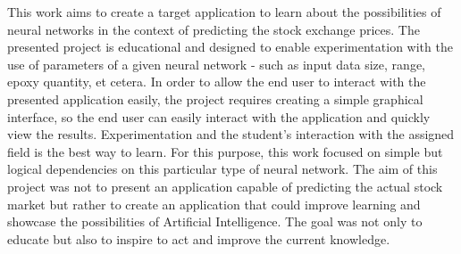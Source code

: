     \par
    \bigskip
    This work aims to create a target application to learn about the possibilities of neural networks in the context of predicting the stock exchange prices. The presented project is educational and designed to enable experimentation with the use of parameters of a given neural network - such as input data size, range, epoxy quantity, et cetera. In order to allow the end user to interact with the presented application easily, the project requires creating a simple graphical interface, so the end user can easily interact with the application and quickly view the results. Experimentation and the student's interaction with the assigned field is the best way to learn. For this purpose, this work focused on simple but logical dependencies on this particular type of neural network. The aim of this project was not to present an application capable of predicting the actual stock market but rather to create an application that could improve learning and showcase the possibilities of Artificial Intelligence. The goal was not only to educate but also to inspire to act and improve the current knowledge.